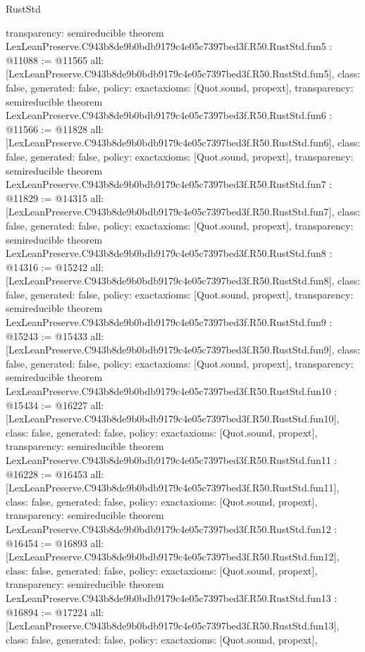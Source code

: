 \begin{lexlean}{RustStd}
\begin{coremodule}
{  transparency: semireducible
}
theorem LexLeanPreserve.C943b8de9b0bdb9179c4e05c7397bed3f.R50.RustStd.fun5 : @11088 := @11565 {
  all: [LexLeanPreserve.C943b8de9b0bdb9179c4e05c7397bed3f.R50.RustStd.fun5],
  class: false,
  generated: false,
  policy: exact{axioms: [Quot.sound, propext]},
  transparency: semireducible
}
theorem LexLeanPreserve.C943b8de9b0bdb9179c4e05c7397bed3f.R50.RustStd.fun6 : @11566 := @11828 {
  all: [LexLeanPreserve.C943b8de9b0bdb9179c4e05c7397bed3f.R50.RustStd.fun6],
  class: false,
  generated: false,
  policy: exact{axioms: [Quot.sound, propext]},
  transparency: semireducible
}
theorem LexLeanPreserve.C943b8de9b0bdb9179c4e05c7397bed3f.R50.RustStd.fun7 : @11829 := @14315 {
  all: [LexLeanPreserve.C943b8de9b0bdb9179c4e05c7397bed3f.R50.RustStd.fun7],
  class: false,
  generated: false,
  policy: exact{axioms: [Quot.sound, propext]},
  transparency: semireducible
}
theorem LexLeanPreserve.C943b8de9b0bdb9179c4e05c7397bed3f.R50.RustStd.fun8 : @14316 := @15242 {
  all: [LexLeanPreserve.C943b8de9b0bdb9179c4e05c7397bed3f.R50.RustStd.fun8],
  class: false,
  generated: false,
  policy: exact{axioms: [Quot.sound, propext]},
  transparency: semireducible
}
theorem LexLeanPreserve.C943b8de9b0bdb9179c4e05c7397bed3f.R50.RustStd.fun9 : @15243 := @15433 {
  all: [LexLeanPreserve.C943b8de9b0bdb9179c4e05c7397bed3f.R50.RustStd.fun9],
  class: false,
  generated: false,
  policy: exact{axioms: [Quot.sound, propext]},
  transparency: semireducible
}
theorem LexLeanPreserve.C943b8de9b0bdb9179c4e05c7397bed3f.R50.RustStd.fun10 : @15434 := @16227 {
  all: [LexLeanPreserve.C943b8de9b0bdb9179c4e05c7397bed3f.R50.RustStd.fun10],
  class: false,
  generated: false,
  policy: exact{axioms: [Quot.sound, propext]},
  transparency: semireducible
}
theorem LexLeanPreserve.C943b8de9b0bdb9179c4e05c7397bed3f.R50.RustStd.fun11 : @16228 := @16453 {
  all: [LexLeanPreserve.C943b8de9b0bdb9179c4e05c7397bed3f.R50.RustStd.fun11],
  class: false,
  generated: false,
  policy: exact{axioms: [Quot.sound, propext]},
  transparency: semireducible
}
theorem LexLeanPreserve.C943b8de9b0bdb9179c4e05c7397bed3f.R50.RustStd.fun12 : @16454 := @16893 {
  all: [LexLeanPreserve.C943b8de9b0bdb9179c4e05c7397bed3f.R50.RustStd.fun12],
  class: false,
  generated: false,
  policy: exact{axioms: [Quot.sound, propext]},
  transparency: semireducible
}
theorem LexLeanPreserve.C943b8de9b0bdb9179c4e05c7397bed3f.R50.RustStd.fun13 : @16894 := @17224 {
  all: [LexLeanPreserve.C943b8de9b0bdb9179c4e05c7397bed3f.R50.RustStd.fun13],
  class: false,
  generated: false,
  policy: exact{axioms: [Quot.sound, propext]},
}
\end{coremodule}
\end{lexlean}
